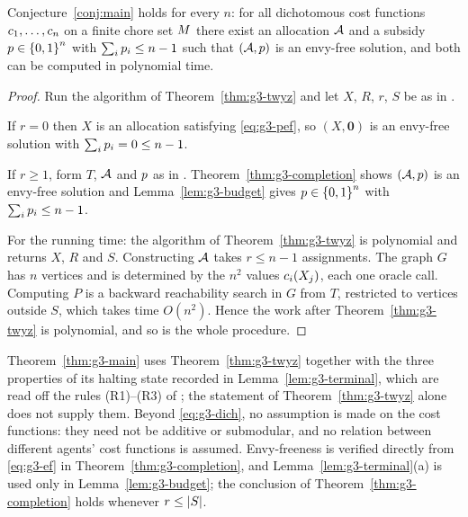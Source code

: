 \begin{theorem}
\label{thm:g3-main}
Conjecture~\ref{conj:main} holds for every $n$: for all dichotomous cost
functions $c_1,\dots,c_n$ on a finite chore set $M$ there exist
an allocation $\mathcal{A}$ and a subsidy $p \in \left\{0,1\right\}^n$ with
$\sum_i p_i \le n-1$ such that $(\mathcal{A},p)$ is an envy-free
solution, and both can be computed in polynomial time.
\end{theorem}
\begin{proof}
Run the algorithm of Theorem~\ref{thm:g3-twyz} and let $X$, $R$, $r$, $S$ be
as in .

If $r = 0$ then $X$ is an allocation satisfying \eqref{eq:g3-pef}, so
$(X, \mathbf 0)$ is an envy-free solution with $\sum_i p_i = 0 \le n-1$.

If $r \ge 1$, form $T$, $\mathcal{A}$ and $p$ as in
. Theorem~\ref{thm:g3-completion} shows
$(\mathcal{A},p)$ is an envy-free solution and
Lemma~\ref{lem:g3-budget} gives $p \in \left\{0,1\right\}^n$ with
$\sum_i p_i \le n-1$.

For the running time: the algorithm of Theorem~\ref{thm:g3-twyz} is
polynomial and returns $X$, $R$ and $S$. Constructing $\mathcal{A}$ takes $r \le
n-1$ assignments. The graph $G$ has $n$ vertices and is determined by the
$n^2$ values $c_i(X_j)$, each one oracle call. Computing $P$ is a
backward reachability search in $G$ from $T$, restricted to vertices outside
$S$, which takes time $O(n^2)$. Hence the work after
Theorem~\ref{thm:g3-twyz} is polynomial, and so is the whole procedure.
\end{proof}

\begin{remark}
\label{rem:g3-dependency}
Theorem~\ref{thm:g3-main} uses Theorem~\ref{thm:g3-twyz} together with the
three properties of its halting state recorded in
Lemma~\ref{lem:g3-terminal}, which are read off the rules (R1)--(R3) of
; the statement of Theorem~\ref{thm:g3-twyz} alone does
not supply them. Beyond \eqref{eq:g3-dich}, no assumption is made on the cost
functions: they need not be additive or submodular, and no relation between
different agents' cost functions is assumed. Envy-freeness is verified
directly from \eqref{eq:g3-ef} in Theorem~\ref{thm:g3-completion}, and
Lemma~\ref{lem:g3-terminal}(a) is used only in
Lemma~\ref{lem:g3-budget}; the conclusion of
Theorem~\ref{thm:g3-completion} holds whenever $r \le \left\lvert S\right\rvert$.
\end{remark}
